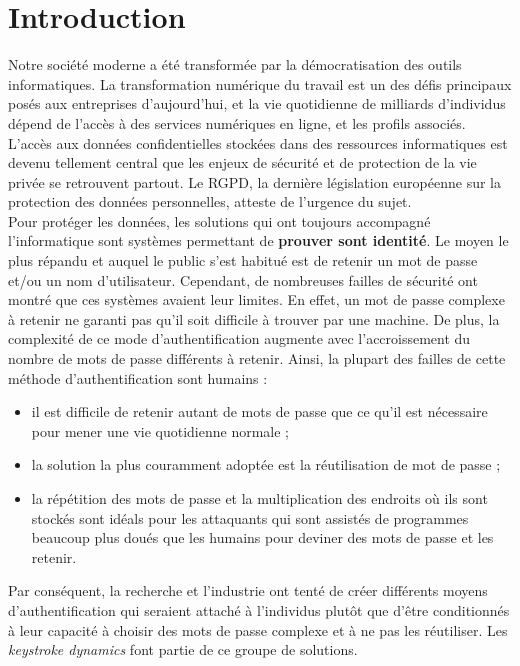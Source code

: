 \section{Introduction}
Notre société moderne a été transformée par la démocratisation des outils informatiques. La transformation numérique du travail est un des défis principaux posés aux entreprises d'aujourd'hui, et la vie quotidienne de milliards d'individus dépend de l'accès à des services numériques en ligne, et les profils associés. \\
L'accès aux données confidentielles stockées dans des ressources informatiques est devenu tellement central que les enjeux de sécurité et de protection de la vie privée se retrouvent partout. Le RGPD, la dernière législation européenne sur la protection des données personnelles, atteste de l'urgence du sujet. \\
Pour protéger les données, les solutions qui ont toujours accompagné l'informatique sont systèmes permettant de \textbf{prouver sont identité}. Le moyen le plus répandu et auquel le public s'est habitué est de retenir un mot de passe et/ou un nom d'utilisateur. Cependant, de nombreuses failles de sécurité ont montré que ces systèmes avaient leur limites. En effet, un mot de passe complexe à retenir ne garanti pas qu'il soit difficile à trouver par une machine. De plus, la complexité de ce mode d'authentification augmente avec l'accroissement du nombre de mots de passe différents à retenir. Ainsi, la plupart des failles de cette méthode d'authentification sont humains :

\begin{itemize}
	\item
	il est difficile de retenir autant de mots de passe que ce qu'il est nécessaire pour mener une vie quotidienne normale ;
	\item
	la solution la plus couramment adoptée est la réutilisation de mot de passe ;
	\item
	la répétition des mots de passe et la multiplication des endroits où ils sont stockés sont idéals pour les attaquants qui sont assistés de programmes beaucoup plus doués que les humains pour deviner des mots de passe et les retenir.
\end{itemize}

Par conséquent, la recherche et l'industrie ont tenté de créer différents moyens d'authentification qui seraient attaché à l'individus plutôt que d'être conditionnés à leur capacité à choisir des mots de passe complexe et à ne pas les réutiliser. Les \textit{keystroke dynamics} font partie de ce groupe de solutions. \\

